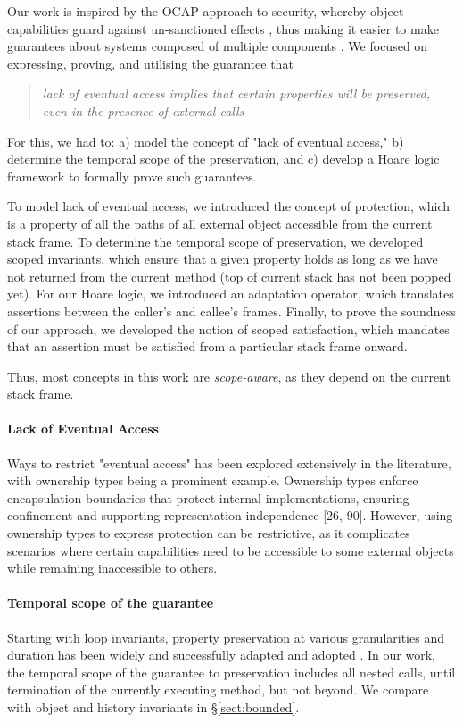 
Our work is inspired by the OCAP approach to security, whereby object capabilities guard against un-sanctioned effects \cite{miller-esop2013,MillerPhD}, thus making it easier to make guarantees about systems composed of multiple components
\cite{Murray10dphil}.
We focused on expressing, proving, and utilising the guarantee that
\begin{quote}
\emph{lack of eventual access implies that certain properties will be preserved, \\ even in the presence of external calls}
\end{quote}
For this, we had  to: a) model the concept of "lack of eventual access," b) determine the temporal scope of the preservation, and c) develop a Hoare logic framework to formally prove such guarantees.

To model lack of eventual access,  we introduced the concept of protection, which is a property of all  the paths of all external object accessible from the current stack frame.
 To determine the  temporal scope of preservation, we developed scoped invariants, which ensure that a given property holds as long as we have not returned from the current method (top of current stack has not been popped yet). 
 For our Hoare logic, we introduced an adaptation operator, which translates assertions between the caller’s and callee’s frames. 
 Finally, to prove the soundness of our approach, we developed the notion of scoped satisfaction,  which mandates that an assertion must be satisfied from a particular stack frame onward. 
 
 Thus, most concepts in this work are  \emph{scope-aware}, as they depend  on the current stack frame.

\paragraph{Lack of Eventual Access} Ways to restrict  "eventual access" has been explored extensively in the literature, with ownership types being a prominent example. Ownership types enforce encapsulation boundaries that protect internal implementations, ensuring confinement and supporting representation independence [26, 90]. However, using ownership types to express protection can be restrictive, as it complicates scenarios where certain capabilities need to be accessible to some external objects while remaining inaccessible to others.
 



 
\paragraph{Temporal scope of the guarantee} Starting with loop invariants\cite{Hoare69,Floyd67}, property preservation at various granularities and duration has been widely and successfully adapted and adopted \cite{Hoare74,liskov94behavioral,usinghistory,Cohen10,Meyer92,MeyerDBC92,BarDelFahLeiSch04,objInvars,MuellerPoetzsch-HeffterLeavens06,DrossoFrancaMuellerSummers08}.
In our work, the temporal scope of the guarantee to preservation includes all nested calls, until termination of the currently executing method, but not beyond. 
We compare with object and history invariants in \S \ref{sect:bounded}.

